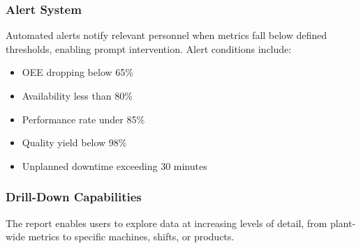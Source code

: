 \documentclass[11pt,a4paper]{article}
\begin{document}
\subsubsection{Alert System}
Automated alerts notify relevant personnel when metrics fall below defined thresholds, enabling prompt intervention. Alert conditions include:

\begin{itemize}
    \item OEE dropping below 65\%
    \item Availability less than 80\%
    \item Performance rate under 85\%
    \item Quality yield below 98\%
    \item Unplanned downtime exceeding 30 minutes
\end{itemize}

\subsubsection{Drill-Down Capabilities}
The report enables users to explore data at increasing levels of detail, from plant-wide metrics to specific machines, shifts, or products.
\end{document}
